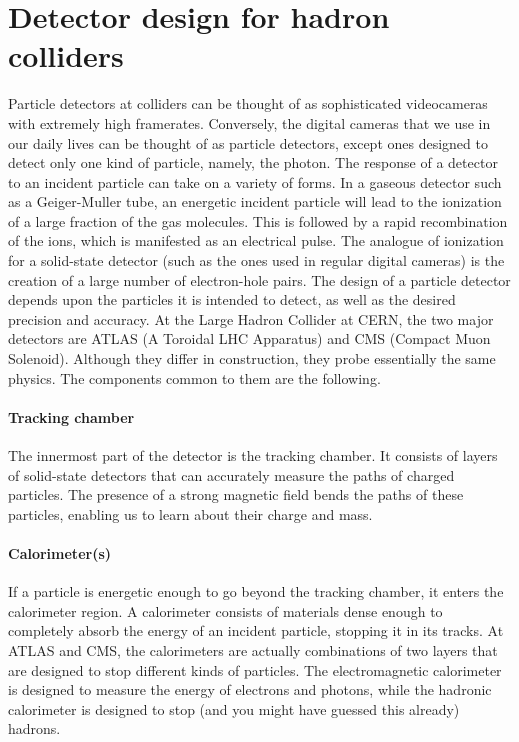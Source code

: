 \section{Detector design for hadron colliders}
Particle detectors at colliders can be thought of as sophisticated videocameras with extremely high framerates. Conversely, the digital cameras that we use in our daily lives can be thought of as particle detectors, except ones designed to detect only one kind of particle, namely, the photon. The response of a detector to an incident particle can take on a variety of forms. In a gaseous detector such as a  Geiger-Muller tube, an energetic incident particle will lead to the ionization of a large fraction of the gas molecules. This is followed by a rapid recombination of the ions, which is manifested as an electrical pulse. The analogue of ionization for a solid-state detector (such as the ones used in regular digital cameras) is the creation of a large number of electron-hole pairs. The design of a particle detector depends upon the particles it is intended to detect, as well as the desired precision and accuracy.
At the Large Hadron Collider at CERN, the two major detectors are ATLAS (A Toroidal LHC Apparatus) and CMS (Compact Muon Solenoid). Although they differ in construction, they probe essentially the same physics. The components common to them are the following.
\paragraph{Tracking chamber}
The innermost part of the detector is the tracking chamber. It consists of layers of solid-state detectors that can accurately measure the paths of charged particles. The presence of a strong magnetic field bends the paths of these particles, enabling us to learn about their charge and mass.
\paragraph{Calorimeter(s)}
If a particle is energetic enough to go beyond the tracking chamber, it enters the calorimeter region. A calorimeter consists of materials dense enough to completely absorb the energy of an incident particle, stopping it in its tracks. At ATLAS and CMS, the calorimeters are actually combinations of two layers that are designed to stop different kinds of particles. The electromagnetic calorimeter is designed to measure the energy of electrons and photons, while the hadronic calorimeter is designed to stop (and you might have guessed this already) hadrons. 

